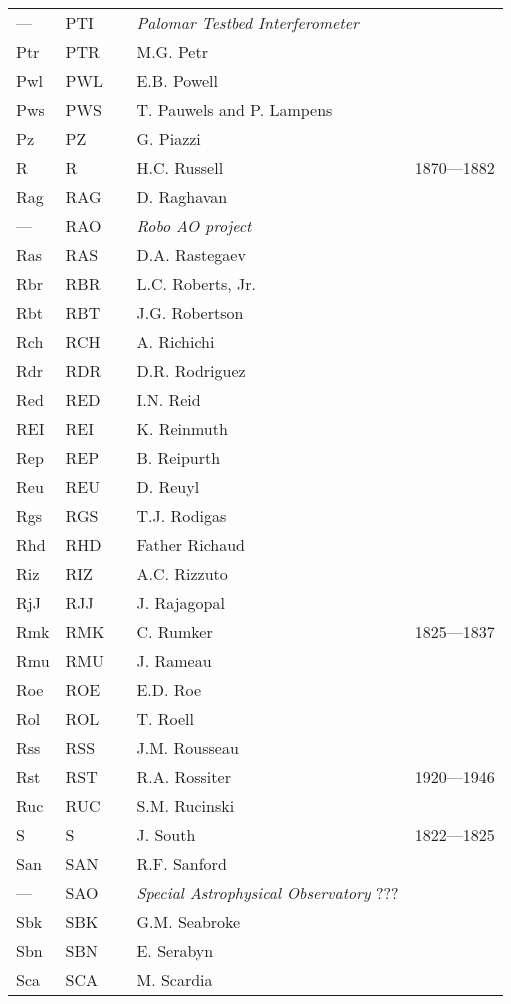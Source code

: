 \begin{longtable}{l|l|c|p{59mm}|l}
--- & PTI &   & \emph{Palomar Testbed Interferometer} & \\
Ptr & PTR &   & M.G. Petr & \\
Pwl & PWL &   & E.B. Powell & \\
Pws & PWS &   & T. Pauwels and P. Lampens & \\
Pz  & PZ  &   & G. Piazzi & \\\midrule
R   & R   &   & H.C. Russell & 1870---1882 \\
Rag & RAG &   & D. Raghavan & \\
--- & RAO &   & \emph{Robo AO project} & \\
Ras & RAS &   & D.A. Rastegaev & \\
Rbr & RBR &   & L.C. Roberts, Jr. & \\
Rbt & RBT &   & J.G. Robertson & \\
Rch & RCH &   & A. Richichi & \\
Rdr & RDR &   & D.R. Rodriguez & \\
Red & RED &   & I.N. Reid & \\
REI & REI &   & K. Reinmuth & \\
Rep & REP &   & B. Reipurth & \\
Reu & REU &   & D. Reuyl & \\
Rgs & RGS &   & T.J. Rodigas & \\
Rhd & RHD &   & Father Richaud & \\
Riz & RIZ &   & A.C. Rizzuto & \\
RjJ & RJJ &   & J. Rajagopal & \\
Rmk & RMK &   & C. Rumker & 1825---1837 \\
Rmu & RMU &   & J. Rameau & \\
Roe & ROE &   & E.D. Roe & \\
Rol & ROL &   & T. Roell & \\
Rss & RSS &   & J.M. Rousseau & \\
Rst & RST &   & R.A. Rossiter & 1920---1946 \\
Ruc & RUC &   & S.M. Rucinski & \\\midrule
S   & S   &   & J. South & 1822---1825 \\
San & SAN &   & R.F. Sanford & \\
--- & SAO &   & \emph{Special Astrophysical Observatory} ??? & \\
Sbk & SBK &   & G.M. Seabroke & \\
Sbn & SBN &   & E. Serabyn & \\
Sca & SCA &   & M. Scardia & \\

\end{longtable}
